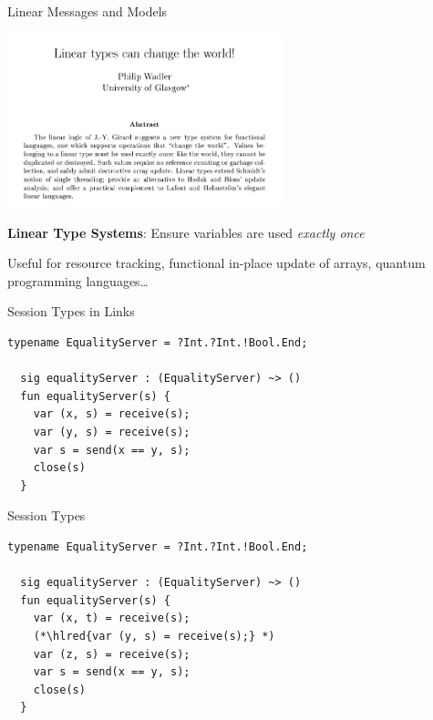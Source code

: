 \documentclass[11.5pt, aspectratio=169]{beamer}
\begin{document}
\begin{frame}{Linear Messages and Models}

  \begin{center}
    \includegraphics[width=0.6\textwidth]{images/linear-types.png}
  \end{center}

  \begin{fullpageitemize}
  \item \textbf{Linear Type Systems}: Ensure variables are used \emph{exactly once}
  \begin{itemize}
    \itemR Useful for resource tracking, functional in-place update of arrays, quantum programming languages\ldots
  \end{itemize}
  \end{fullpageitemize}

\end{frame}

\begin{frame}[fragile]{Session Types in Links}

\begin{lstlisting}[language=links]
  typename EqualityServer = ?Int.?Int.!Bool.End;

  sig equalityServer : (EqualityServer) ~> ()
  fun equalityServer(s) {
    var (x, s) = receive(s);
    var (y, s) = receive(s);
    var s = send(x == y, s);
    close(s)
  }
\end{lstlisting}
\end{frame}

\begin{frame}[fragile]{Session Types}
\begin{lstlisting}[language=links]
  typename EqualityServer = ?Int.?Int.!Bool.End;

  sig equalityServer : (EqualityServer) ~> ()
  fun equalityServer(s) {
    var (x, t) = receive(s);
    (*\hlred{var (y, s) = receive(s);} *)
    var (z, s) = receive(s);
    var s = send(x == y, s);
    close(s)
  }
\end{lstlisting}
\end{frame}
\end{document}
